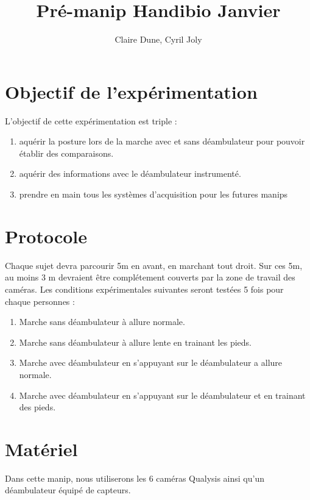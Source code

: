 \documentclass[a4paper, 10pt ]{article}
\title{\LARGE \bf
 Pré-manip Handibio Janvier
}
\author{Claire Dune, Cyril Joly}
\begin{document}
\maketitle
\thispagestyle{empty}
\pagestyle{empty}

\section{Objectif de l'expérimentation}

L'objectif de cette expérimentation est triple : 
\begin{enumerate}
\item aquérir la posture lors de la marche avec et sans déambulateur pour pouvoir établir des comparaisons. 
\item aquérir des informations avec le déambulateur instrumenté.
\item prendre en main tous les systèmes d'acquisition pour les futures manips
\end{enumerate}

\section{Protocole}

Chaque sujet devra parcourir 5m en avant, en marchant tout droit. Sur ces 5m, au moins 3 m devraient être complétement couverts par la zone de travail des caméras. Les conditions expérimentales suivantes seront testées 5 fois pour chaque personnes : 

\begin{enumerate}
\item Marche sans déambulateur à allure normale.
\item Marche sans déambulateur à allure lente en trainant les pieds.
\item Marche avec déambulateur en s'appuyant sur le déambulateur a allure normale.
\item Marche avec déambulateur en s'appuyant sur le déambulateur et en trainant des pieds.
\end{enumerate}

\section{Matériel}

Dans cette manip, nous utiliserons les 6 caméras Qualysis ainsi qu'un déambulateur équipé de capteurs.
\end{document}
